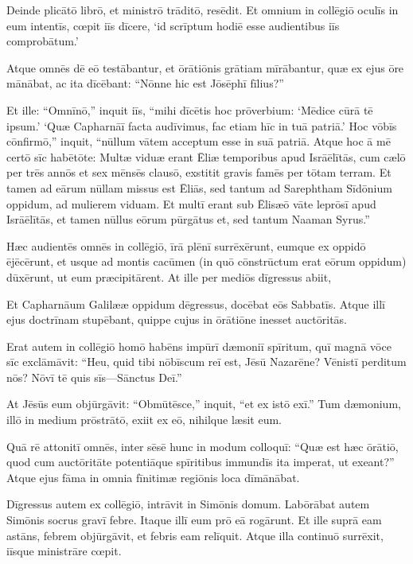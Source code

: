 \Versus Deinde plicātō librō, et ministrō trāditō, resēdit. Et omnium in collēgiō oculīs in eum intentīs,
\Versus cœpit iīs dīcere, `id scrīptum hodiē esse audientibus iīs comprobātum.'

\Versus Atque omnēs dē eō testābantur, et ōrātiōnis grātiam mīrābantur, quæ ex ejus ōre mānābat, ac ita dīcēbant: ``Nōnne hic est Jōsēphī fīlius?''

\Versus Et ille: ``Omnīnō,'' inquit iīs, ``mihi dīcētis hoc prōverbium: `Mēdice cūrā tē ipsum.' `Quæ Capharnāī facta audīvimus, fac etiam hīc in tuā patriā.'
\Versus Hoc vōbīs cōnfirmō,'' inquit, ``nūllum vātem acceptum esse in suā patriā.
\Versus Atque hoc ā mē certō sīc habētōte: Multæ viduæ erant Ēliæ temporibus apud Isrāēlītās, cum cælō per trēs annōs et sex mēnsēs clausō, exstitit gravis famēs per tōtam terram.
\Versus Et tamen ad eārum nūllam missus est Ēliās, sed tantum ad Sarephtham Sīdōnium oppidum, ad mulierem viduam.
\Versus Et multī erant sub Ēlisæō vāte leprōsī apud Isrāēlītās, et tamen nūllus eōrum pūrgātus et, sed tantum Naaman Syrus.''

\Versus Hæc audientēs omnēs in collēgiō, īrā plēnī surrēxērunt,
\Versus eumque ex oppidō ējēcērunt, et usque ad montis cacūmen (in quō cōnstrūctum erat eōrum oppidum) dūxērunt, ut eum præcipitārent.
\Versus At ille per mediōs dīgressus abiit,

\Versus Et Capharnāum Galilææ oppidum dēgressus, docēbat eōs Sabbatīs.
\Versus Atque illī ejus doctrīnam stupēbant, quippe cujus in ōrātiōne inesset auctōritās.

\Versus Erat autem in collēgiō homō habēns impūrī dæmoniī spīritum, quī magnā vōce sīc exclāmāvit:
\Versus ``Heu, quid tibi nōbīscum reī est, Jēsū Nazarēne? Vēnistī perditum nōs? Nōvī tē quis sīs—Sānctus Deī.''

\Versus At Jēsūs eum objūrgāvit: ``Obmūtēsce,'' inquit, ``et ex istō exī.'' Tum dæmonium, illō in medium prōstrātō, exiit ex eō, nihilque læsit eum.

\Versus Quā rē attonitī omnēs, inter sēsē hunc in modum colloquī: ``Quæ est hæc ōrātiō, quod cum auctōritāte potentiāque spīritibus immundīs ita imperat, ut exeant?''
\Versus Atque ejus fāma in omnia fīnitimæ regiōnis loca dīmānābat.

\Versus Dīgressus autem ex collēgiō, intrāvit in Simōnis domum. Labōrābat autem Simōnis socrus gravī febre. Itaque illī eum prō eā rogārunt.
\Versus Et ille suprā eam astāns, febrem objūrgāvit, et febris eam relīquit. Atque illa continuō surrēxit, iīsque ministrāre cœpit.

